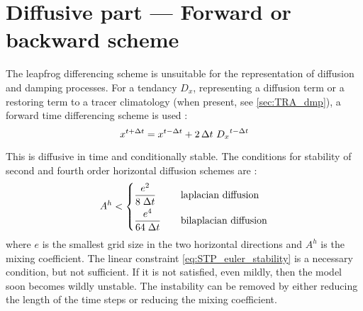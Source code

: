 \documentclass[../tex_main/NEMO_manual]{subfiles}
\begin{document}
\section{Diffusive part --- Forward or backward scheme}
\label{sec:STP_forward_imp}

The leapfrog differencing scheme is unsuitable for the representation of 
diffusion and damping processes. For a tendancy $D_x$, representing a 
diffusion term or a restoring term to a tracer climatology 
(when present, see \autoref{sec:TRA_dmp}), a forward time differencing scheme
 is used :
\begin{equation} \label{eq:STP_euler}
   x^{t+\Delta t} = x^{t-\Delta t} + 2 \, \Delta t \ {D_x}^{t-\Delta t}
\end{equation} 

This is diffusive in time and conditionally stable. The 
conditions for stability of second and fourth order horizontal diffusion schemes are \citep{Griffies_Bk04}:
\begin{equation} \label{eq:STP_euler_stability}
A^h < \left\{
\begin{aligned}
                    &\frac{e^2}{  8 \; \Delta t } 	&&\quad \text{laplacian diffusion} 	\\
                    &\frac{e^4}{64 \; \Delta t } 	&&\quad \text{bilaplacian diffusion} 
            \end{aligned}
\right.
\end{equation}
where $e$ is the smallest grid size in the two horizontal directions and $A^h$ is 
the mixing coefficient. The linear constraint \autoref{eq:STP_euler_stability} 
is a necessary condition, but not sufficient. If it is not satisfied, even mildly, 
then the model soon becomes wildly unstable. The instability can be removed 
by either reducing the length of the time steps or reducing the mixing coefficient.
\end{document}
